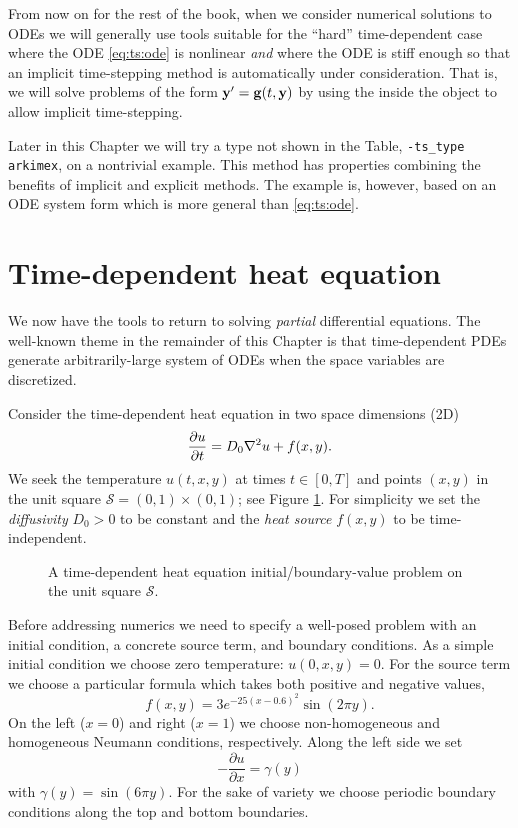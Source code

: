From now on for the rest of the book, when we consider numerical solutions to ODEs we will generally use tools suitable for the ``hard'' time-dependent case where the ODE \eqref{eq:ts:ode} is nonlinear \emph{and} where the ODE is stiff enough so that an implicit time-stepping method is automatically under consideration.  That is, we will solve problems of the form $\mathbf{y}' = \mathbf{g}(t,\mathbf{y})$ by using the \pSNES inside the \pTS object to allow implicit time-stepping.

Later in this Chapter we will try a type not shown in the Table, \texttt{-ts\_type arkimex}, on a nontrivial example.  This method has properties combining the benefits of implicit and explicit methods.  The example is, however, based on an ODE system form which is more general than \eqref{eq:ts:ode}.


\section{Time-dependent heat equation}

We now have the tools to return to solving \emph{partial} differential equations.  The well-known theme in the remainder of this Chapter is that time-dependent PDEs generate arbitrarily-large system of ODEs when the space variables are discretized.

Consider the time-dependent heat equation in two space dimensions (2D)
\begin{equation}
\frac{\partial u}{\partial t} = D_0 \nabla^2 u + f(x,y). \label{eq:ts:heatequation}
\end{equation}
We seek the temperature $u(t,x,y)$ at times $t \in [0,T]$ and points $(x,y)$ in the unit square $\mathcal{S} =(0,1)\times (0,1)$; see Figure \ref{fig:ts:heatsquare}.  For simplicity we set the \emph{diffusivity} $D_0>0$ to be constant and the \emph{heat source} $f(x,y)$ to be time-independent.

\begin{figure}

\caption{A time-dependent heat equation initial/boundary-value problem on the unit square $\mathcal{S}$.}
\label{fig:ts:heatsquare}
\end{figure}

Before addressing numerics we need to specify a well-posed problem with an initial condition, a concrete source term, and boundary conditions.  As a simple initial condition we choose zero temperature: $u(0,x,y)=0$.  For the source term we choose a particular formula which takes both positive and negative values,
    $$f(x,y) = 3 e^{-25(x-0.6)^2} \sin(2 \pi y).$$
On the left ($x=0$) and right ($x=1$) we choose non-homogeneous and homogeneous Neumann conditions, respectively.  Along the left side we set
\begin{equation}
-\frac{\partial u}{\partial x} = \gamma(y) \label{eq:ts:leftneumannbc}
\end{equation}
with $\gamma(y) = \sin(6\pi y)$.  For the sake of variety we choose periodic boundary conditions along the top and bottom boundaries.

